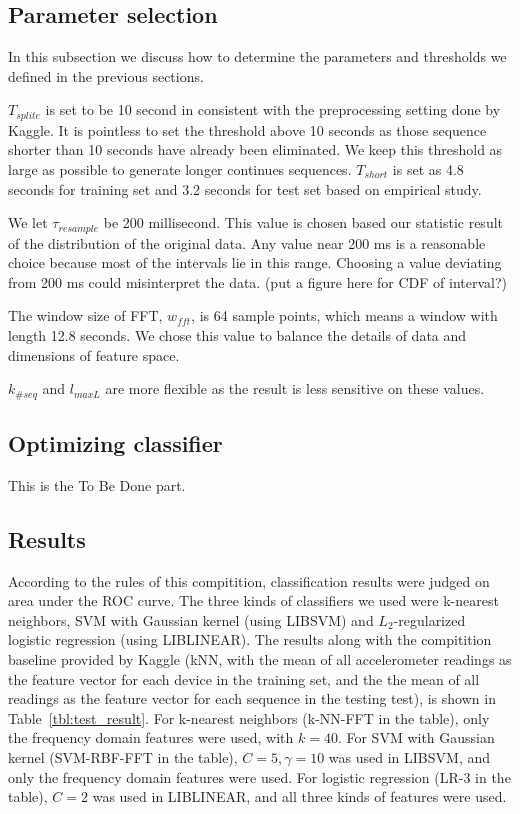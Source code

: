 \documentclass{article} %
\begin{document}
\subsection{Parameter selection}
In this subsection we discuss how to determine the parameters and thresholds we defined in the previous sections.

$T_{splite}$ is set to be 10 second in consistent with the preprocessing setting done by Kaggle. It is pointless to set the threshold above 10 seconds as those sequence shorter than 10 seconds have already been eliminated. We keep this threshold as large as possible to generate longer continues sequences. $T_{short}$ is set as 4.8 seconds for training set and 3.2 seconds for test set based on empirical study. 

We let $\tau_{resample}$ be 200 millisecond. This value is chosen based our statistic result of the distribution of the original data. Any value near 200 ms is a reasonable choice because most of the intervals lie in this range. Choosing a value deviating from 200 ms could misinterpret the data. (put a figure here for CDF of interval?)

The window size of FFT, $w_{fft}$, is 64 sample points, which means a window with length 12.8 seconds. We chose this value to balance the details of data and dimensions of feature space. 

$k_{\#seq}$ and  $l_{maxL}$ are more flexible as the result is less sensitive on these values.

\subsection{Optimizing classifier}
This is the To Be Done part.

\subsection{Results}

According to the rules of this compitition, classification results were judged on area under the ROC curve. The three kinds of classifiers we used were k-nearest neighbors, SVM with Gaussian kernel (using LIBSVM) and $L_2$-regularized logistic regression (using LIBLINEAR). The results along with the compitition baseline provided by Kaggle (kNN, with the mean of all accelerometer readings as the feature vector for each device in the training set, and the the mean of all readings as the feature vector for each sequence in the testing test), is shown in Table~\ref{tbl:test_result}. For k-nearest neighbors (k-NN-FFT in the table), only the frequency domain features were used, with $k=40$. For SVM with Gaussian kernel (SVM-RBF-FFT in the table), $C=5, \gamma=10$ was used in LIBSVM, and only the frequency domain features were used. For logistic regression (LR-3 in the table), $C=2$ was used in LIBLINEAR, and all three kinds of features were used.
\end{document}
